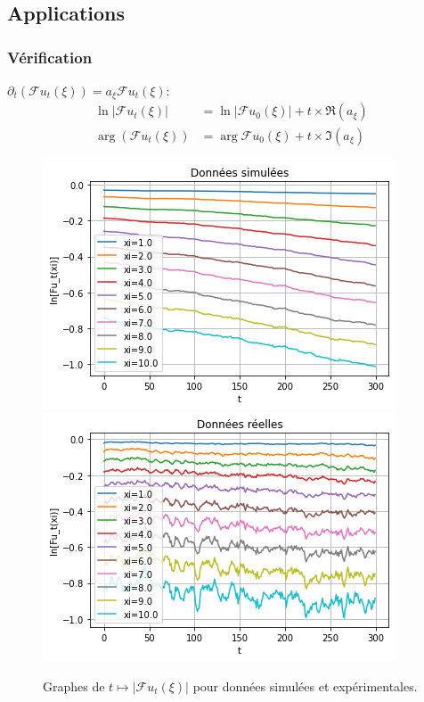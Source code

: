 \documentclass{beamer}
\newcommand{\pth}[1]{\left(#1\right)}
\newcommand{\abs}[1]{\left|#1\right|}
\newcommand{\dr}{\partial}
\newcommand{\fr}{\mathcal{F}}
\begin{document}
\subsection{Applications}


\begin{frame}
  \frametitle{Vérification}
  $\dr_t(\fr u_t(\xi))=a_{\xi}\fr u_t(\xi)$:
\begin{align*}
  \ln\abs{\fr u_t(\xi)}&=\ln\abs{\fr u_0(\xi)}+t\times\Re(a_{\xi})\\
  \arg\pth{\fr u_t(\xi)}&=\arg{\fr u_0(\xi)}+t\times\Im(a_{\xi})
\end{align*}

\vspace{0.5cm}\pause
\begin{figure}
  
\includegraphics[scale=0.4]{img/proj_non_norm_sim}
\includegraphics[scale=0.4]{img/proj_non_norm_rea}
  \caption{Graphes de $t\mapsto \abs{\fr u_t(\xi)}$ pour données simulées et expérimentales.}
  
\end{figure}


\end{frame}
\end{document}
